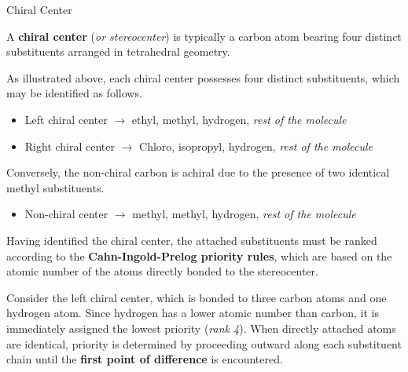 \documentclass[10pt]{article}
\begin{document}
      \begin{core}{Chiral Center}

        A \textbf{chiral center} (\textit{or stereocenter}) is typically a carbon atom bearing four distinct substituents arranged in tetrahedral geometry.


        As illustrated above, each chiral center possesses four distinct substituents, which may be identified as follows.

        \begin{itemize}

          \item Left chiral center $\rightarrow$ ethyl, methyl, hydrogen, \textit{rest of the molecule}

          \item Right chiral center $\rightarrow$ Chloro, isopropyl, hydrogen, \textit{rest of the molecule}

        \end{itemize}

        Conversely, the non-chiral carbon is achiral due to the presence of two identical methyl substituents.

        \begin{itemize}

          \item Non-chiral center $\rightarrow$ methyl, methyl, hydrogen, \textit{rest of the molecule}

        \end{itemize}

        Having identified the chiral center, the attached substituents must be ranked according to the \textbf{Cahn-Ingold-Prelog priority rules}, which are based on the atomic number of the atoms directly bonded to the stereocenter.

        Consider the left chiral center, which is bonded to three carbon atoms and one hydrogen atom. Since hydrogen has a lower atomic number than carbon, it is immediately assigned the lowest priority (\textit{rank 4}). When directly attached atoms are identical, priority is determined by proceeding outward along each substituent chain until the \textbf{first point of difference} is encountered.


\end{core}
\end{document}
